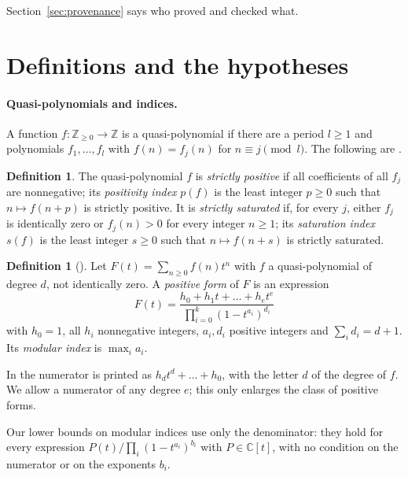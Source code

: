 \documentclass[11pt,a4paper]{article}
\theoremstyle{definition}
\newtheorem{definition}[theorem]{Definition}
\newcommand{\C}{\mathbb{C}}
\newcommand{\Z}{\mathbb{Z}}
\begin{document}
Section~\ref{sec:provenance} says who proved and checked what.

\section{Definitions and the hypotheses}\label{sec:defs}

\paragraph{Quasi-polynomials and indices.}
A function $f:\Z_{\ge0}\to\Z$ is a quasi-polynomial if there are a period
$l\ge1$ and polynomials $f_1,\dots,f_l$ with $f(n)=f_j(n)$ for $n\equiv j
\pmod l$. The following are \cite[Definitions 1.2.2 and 1.2.4,
pp.~13--14]{GCT6}.

\begin{definition}\label{def:indices}
The quasi-polynomial $f$ is \emph{strictly positive} if all coefficients of
all $f_j$ are nonnegative; its \emph{positivity index} $p(f)$ is the least
integer $p\ge0$ such that $n\mapsto f(n+p)$ is strictly positive. It is
\emph{strictly saturated} if, for every $j$, either $f_j$ is identically zero
or $f_j(n)>0$ for every integer $n\ge1$; its \emph{saturation index} $s(f)$ is
the least integer $s\ge0$ such that $n\mapsto f(n+s)$ is strictly saturated.
\end{definition}

\begin{definition}[{\cite[Definition 1.2.7, p.~15]{GCT6}}]\label{def:positiveform}
Let $F(t)=\sum_{n\ge0}f(n)t^n$ with $f$ a quasi-polynomial of degree $d$, not
identically zero. A \emph{positive form} of $F$ is an expression
\[
 F(t)=\frac{h_0+h_1t+\dots+h_et^e}{\prod_{i=0}^k(1-t^{a_i})^{d_i}}
\]
with $h_0=1$, all $h_i$ nonnegative integers, $a_i,d_i$ positive integers and
$\sum_id_i=d+1$. Its \emph{modular index} is $\max_ia_i$.
\end{definition}

In \cite[eq.~(1.4)]{GCT6} the numerator is printed as $h_dt^d+\dots+h_0$,
with the letter $d$ of the degree of $f$. We allow a numerator of any degree
$e$; this only enlarges the class of positive forms.

Our lower bounds on modular indices use only the denominator: they hold for
every expression $P(t)/\prod_i(1-t^{a_i})^{b_i}$ with $P\in\C[t]$, with no
condition on the numerator or on the exponents $b_i$.
\end{document}
